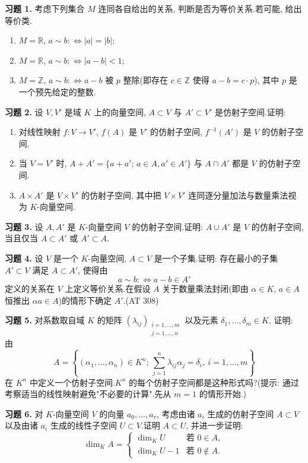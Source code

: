 \aufgaben

\noindent\textbf{习题 1.} 考虑下列集合 $M$ 连同各自给出的关系, 判断是否为等价关系.若可能, 给出等价类.
\begin{enumerate}
\item[(i)] $M = \mathbb{R}$, $a \sim b :\Longleftrightarrow |a| = |b|$;
\item[(ii)] $M = \mathbb{R}$, $a \sim b :\Longleftrightarrow |a - b| < 1$;
\item[(iii)] $M = \mathbb{Z}$, $a \sim b :\Longleftrightarrow a - b$ 被 $p$ 整除(即存在 $c \in \mathbb{Z}$ 使得 $a - b = c \cdot p$), 其中 $p$ 是一个预先给定的整数.
\end{enumerate}

\noindent\textbf{习题 2.} 设 $V, V'$ 是域 $K$ 上的向量空间, $A \subset V$ 与 $A' \subset V'$ 是仿射子空间.证明:
\begin{enumerate}
\item[(i)] 对线性映射 $f \colon V \longrightarrow V'$, $f(A)$ 是 $V'$ 的仿射子空间, $f^{-1}(A')$ 是 $V$ 的仿射子空间.
\item[(ii)] 当 $V = V'$ 时, $A + A' = \{a + a';\, a \in A, a' \in A'\}$ 与 $A \cap A'$ 都是 $V$ 的仿射子空间.
\item[(iii)] $A \times A'$ 是 $V \times V'$ 的仿射子空间, 其中把 $V \times V'$ 连同逐分量加法与数量乘法视为 $K$-向量空间.
\end{enumerate}

\noindent\textbf{习题 3.} 设 $A, A'$ 是 $K$-向量空间 $V$ 的仿射子空间.证明: $A \cup A'$ 是 $V$ 的仿射子空间, 当且仅当 $A \subset A'$ 或 $A' \subset A$.

\noindent\textbf{习题 4.} 设 $V$ 是一个 $K$-向量空间, $A \subset V$ 是一个子集.证明: 存在最小的子集 $A' \subset V$ 满足 $A \subset A'$, 使得由
\[
a \sim b :\Longleftrightarrow a - b \in A'
\]
定义的关系在 $V$ 上定义等价关系.在假设 $A$ 关于数量乘法封闭(即由 $\alpha \in K$, $a \in A$ 恒推出 $\alpha a \in A$)的情形下确定 $A'$.(AT 308)

\noindent\textbf{习题 5.} 对系数取自域 $K$ 的矩阵 $(\lambda_{ij})_{\substack{i = 1, \ldots, m \\ j = 1, \ldots, n}}$ 以及元素 $\delta_1, \ldots, \delta_m \in K$, 证明: 由
\[
A = \left\{(\alpha_1, \ldots, \alpha_n) \in K^n;\, \sum_{j = 1}^{n} \lambda_{ij}\alpha_j = \delta_i, \ i = 1, \ldots, m\right\}
\]
在 $K^n$ 中定义一个仿射子空间.$K^n$ 的每个仿射子空间都是这种形式吗?(提示: 通过考察适当的线性映射避免"不必要的计算".先从 $m = 1$ 的情形开始.)

\noindent\textbf{习题 6.} 对 $K$-向量空间 $V$ 的向量 $a_0, \ldots, a_r$, 考虑由诸 $a_i$ 生成的仿射子空间 $A \subset V$ 以及由诸 $a_i$ 生成的线性子空间 $U \subset V$.证明 $A \subset U$, 并进一步证明:
\[
\dim_K A = \begin{cases} \dim_K U & \text{若 } 0 \in A, \\ \dim_K U - 1 & \text{若 } 0 \notin A\text{.} \end{cases}
\]

